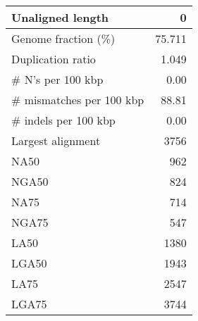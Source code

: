 \documentclass[12pt,a4paper]{article}
\begin{document}
\begin{table}[ht]
\begin{center}
\begin{tabular}{|l*{1}{|r}|}
Unaligned length & 0 \\ \hline
Genome fraction (\%) & 75.711 \\ \hline
Duplication ratio & 1.049 \\ \hline
\# N's per 100 kbp & 0.00 \\ \hline
\# mismatches per 100 kbp & 88.81 \\ \hline
\# indels per 100 kbp & 0.00 \\ \hline
Largest alignment & 3756 \\ \hline
NA50 & 962 \\ \hline
NGA50 & 824 \\ \hline
NA75 & 714 \\ \hline
NGA75 & 547 \\ \hline
LA50 & 1380 \\ \hline
LGA50 & 1943 \\ \hline
LA75 & 2547 \\ \hline
LGA75 & 3744 \\ \hline
\end{tabular}
\end{center}
\end{table}
\end{document}
